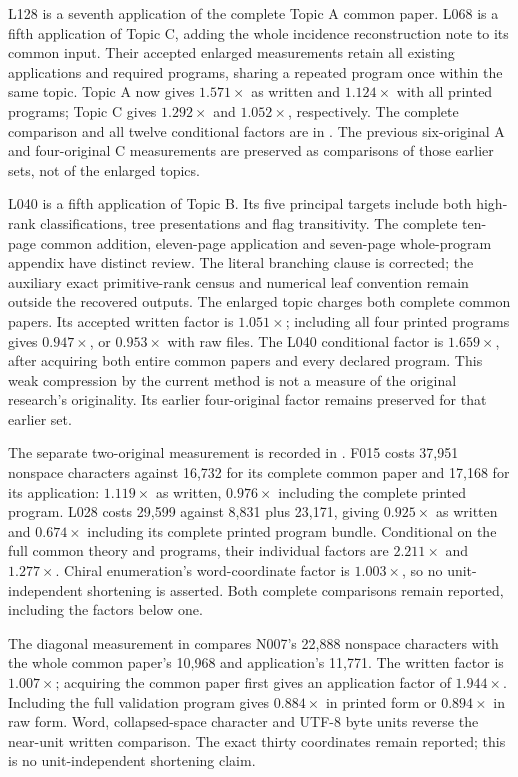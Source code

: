 \documentclass[11pt,a4paper]{article}
\begin{document}
L128 is a seventh application of the complete Topic A common paper. L068 is
a fifth application of Topic C, adding the whole incidence reconstruction note
to its common input. Their accepted enlarged measurements retain all existing
applications and required programs, sharing a repeated program once within
the same topic. Topic A now gives $1.571\times$ as written and
$1.124\times$ with all printed programs; Topic C gives $1.292\times$
and $1.052\times$, respectively. The complete comparison and all twelve
conditional factors are in . The previous six-original A and four-original C measurements
are preserved as comparisons of those earlier sets, not of the enlarged topics.

L040 is a fifth application of Topic B. Its five principal targets include
both high-rank classifications, tree presentations and flag transitivity.
The complete ten-page common addition, eleven-page application and seven-page
whole-program appendix have distinct review. The literal branching clause
is corrected; the auxiliary exact primitive-rank census and numerical leaf
convention remain outside the recovered outputs. The enlarged topic charges
both complete common papers. Its accepted written factor is $1.051\times$;
including all four printed programs gives $0.947\times$, or $0.953\times$
with raw files. The L040 conditional factor is $1.659\times$, after acquiring
both entire common papers and every declared program. This weak compression
by the current method is not a measure of the original research's originality.
Its earlier four-original factor remains preserved for that earlier set.

The separate two-original measurement is recorded in
. F015 costs 37,951 nonspace characters
against 16,732 for its complete common paper and 17,168 for its application:
$1.119\times$ as written, $0.976\times$ including the complete printed program.
L028 costs 29,599 against 8,831 plus 23,171, giving $0.925\times$ as written and
$0.674\times$ including its complete printed program bundle. Conditional on
the full common theory and programs, their individual factors are
$2.211\times$ and $1.277\times$. Chiral enumeration's word-coordinate factor
is $1.003\times$, so no unit-independent shortening is asserted. Both complete
comparisons remain reported, including the factors below one.

The diagonal measurement in  compares
N007's 22,888 nonspace characters with the whole common paper's 10,968 and
application's 11,771. The written factor is $1.007\times$; acquiring the
common paper first gives an application factor of $1.944\times$. Including
the full validation program gives $0.884\times$ in printed form or
$0.894\times$ in raw form. Word, collapsed-space character and UTF-8 byte
units reverse the near-unit written comparison. The exact thirty coordinates
remain reported; this is no unit-independent shortening claim.
\end{document}
